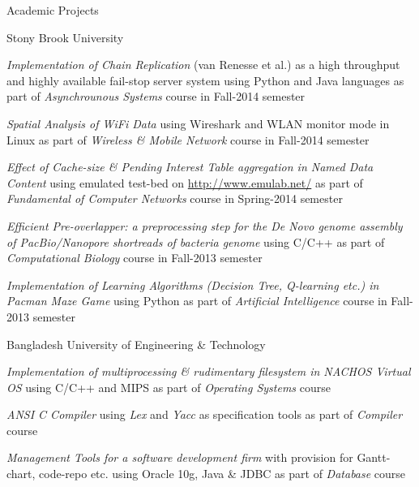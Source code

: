 \documentclass{resume} %
\begin{document}
\begin{rSection}{Academic Projects}
\begin{rSubsection}{Stony Brook University}{}{}{}
\item \textit{Implementation of Chain Replication} (van Renesse et al.) as a
high throughput and highly available fail-stop server system using Python and Java
languages as part of \textit{Asynchrounous Systems} course in Fall-2014 semester
\item \textit{Spatial Analysis of WiFi Data} using Wireshark and WLAN monitor
mode in Linux as part of \textit{Wireless \& Mobile Network} course in Fall-2014
semester 
\item \textit{Effect of Cache-size \& Pending Interest Table
aggregation in Named Data Content} using emulated test-bed on 
\href{http://www.emulab.net/}{http://www.emulab.net/} as part of
\textit{Fundamental of Computer Networks} course in Spring-2014 semester
\item \textit{Efficient Pre-overlapper: a preprocessing step for the De Novo
genome assembly of PacBio/Nanopore shortreads of bacteria genome} using C/C++ as
part of \textit{Computational Biology} course in Fall-2013 semester
\item \textit{Implementation of Learning Algorithms (Decision Tree, Q-learning
etc.) in Pacman Maze Game} using Python as part of \textit{Artificial
Intelligence} course in Fall-2013 semester
\end{rSubsection}  

\begin{rSubsection}{Bangladesh University of Engineering \& Technology}{}{}{}
\item \textit{Implementation of multiprocessing \& rudimentary filesystem in
NACHOS Virtual OS} using C/C++ and MIPS as part of \textit{Operating Systems}
course
\item \textit{ANSI C Compiler} using \textit{Lex} and
\textit{Yacc} as  specification tools as part of \textit{Compiler} course
\begin{comment}
\item \textit{A simple 4-bit Microprocessor based on 8086 architecture}
implemented in hardware using basic chips on breadboard in
\textit{Digital Systems Design} course and simulated in Verilog in \textit{VLSI
Design} course
\item \textit{Cellphone-based Voice-controlled Operation of Home Appliances}
using ATmega32 micro-controller and Microsoft MSDN speech-recognition API as
part of \textit{Computer Interfacing} course
\end{comment}
\item \textit{Management Tools for a software development firm} with provision
for Gantt-chart, code-repo etc. using Oracle 10g, Java \& JDBC as part of
\textit{Database} course
\end{rSubsection}
\end{rSection}
\end{document}
